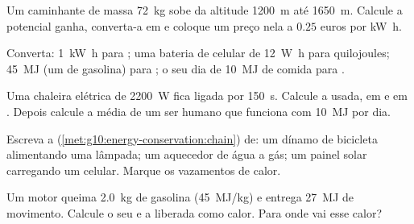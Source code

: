 \begin{exercise}[$\star$]\label{exo:g10:energy-conservation:2}
Um caminhante de massa \qty{72}{kg} sobe da altitude \qty{1200}{m} até
\qty{1650}{m}. Calcule a  potencial ganha, converta-a em
 e coloque um preço nela a $0.25$ euros por \unit{kW.h}.
\end{exercise}

\begin{exercise}[$\star$]\label{exo:g10:energy-conservation:3}
Converta: \qty{1}{kW.h} para ; uma bateria de celular de
\qty{12}{W.h} para quilojoules; \qty{45}{MJ} (um  de gasolina)
para ; o seu dia de \qty{10}{MJ} de comida para
.
\end{exercise}

\begin{exercise}[$\star$]\label{exo:g10:energy-conservation:4}
Uma chaleira elétrica de \qty{2200}{W} fica ligada por \qty{150}{s}.
Calcule a  usada, em  e em . Depois calcule a
 média de um ser humano que funciona com \qty{10}{MJ} por dia.
\end{exercise}

\begin{exercise}[$\star$]\label{exo:g10:energy-conservation:5}
Escreva a  (\cref{met:g10:energy-conservation:chain})
de: um dínamo de bicicleta alimentando uma lâmpada; um aquecedor de água
a gás; um painel solar carregando um celular. Marque os vazamentos de
calor.
\end{exercise}

\begin{exercise}[$\star\star$]\label{exo:g10:energy-conservation:6}
Um motor queima \qty{2.0}{kg} de gasolina (\qty{45}{MJ/kg}) e entrega
\qty{27}{MJ} de movimento. Calcule o seu  e a  liberada
como calor. Para onde vai esse calor?
\end{exercise}

